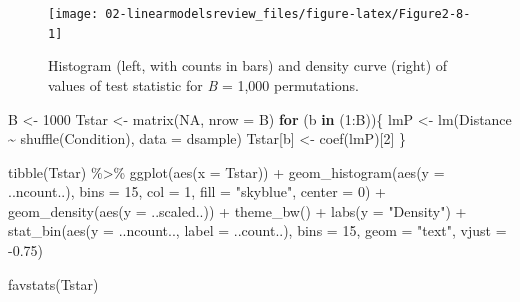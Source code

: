 \documentclass[
]{book}
\newenvironment{Shaded}{\begin{snugshade}}{\end{snugshade}}
\newcommand{\AttributeTok}[1]{\textcolor[rgb]{0.77,0.63,0.00}{#1}}
\newcommand{\ConstantTok}[1]{\textcolor[rgb]{0.00,0.00,0.00}{#1}}
\newcommand{\ControlFlowTok}[1]{\textcolor[rgb]{0.13,0.29,0.53}{\textbf{#1}}}
\newcommand{\DecValTok}[1]{\textcolor[rgb]{0.00,0.00,0.81}{#1}}
\newcommand{\FloatTok}[1]{\textcolor[rgb]{0.00,0.00,0.81}{#1}}
\newcommand{\FunctionTok}[1]{\textcolor[rgb]{0.00,0.00,0.00}{#1}}
\newcommand{\NormalTok}[1]{#1}
\newcommand{\OtherTok}[1]{\textcolor[rgb]{0.56,0.35,0.01}{#1}}
\newcommand{\SpecialCharTok}[1]{\textcolor[rgb]{0.00,0.00,0.00}{#1}}
\newcommand{\StringTok}[1]{\textcolor[rgb]{0.31,0.60,0.02}{#1}}
\begin{document}
\begin{figure}[ht!]

{\centering \texttt{[image: 02-linearmodelsreview\_files/figure-latex/Figure2-8-1]} 

}

\caption{Histogram (left, with counts in bars) and density curve (right) of values of test statistic for \emph{B} = 1,000 permutations.}\label{fig:Figure2-8}
\end{figure}

\begin{Shaded}
\begin{Highlighting}[]
\NormalTok{B }\OtherTok{\textless{}{-}} \DecValTok{1000}
\NormalTok{Tstar }\OtherTok{\textless{}{-}} \FunctionTok{matrix}\NormalTok{(}\ConstantTok{NA}\NormalTok{, }\AttributeTok{nrow =}\NormalTok{ B)}
\ControlFlowTok{for}\NormalTok{ (b }\ControlFlowTok{in}\NormalTok{ (}\DecValTok{1}\SpecialCharTok{:}\NormalTok{B))\{}
\NormalTok{  lmP }\OtherTok{\textless{}{-}} \FunctionTok{lm}\NormalTok{(Distance }\SpecialCharTok{\textasciitilde{}} \FunctionTok{shuffle}\NormalTok{(Condition), }\AttributeTok{data =}\NormalTok{ dsample)}
\NormalTok{  Tstar[b] }\OtherTok{\textless{}{-}} \FunctionTok{coef}\NormalTok{(lmP)[}\DecValTok{2}\NormalTok{]}
\NormalTok{\}}
\end{Highlighting}
\end{Shaded}

\newpage

\small

\begin{Shaded}
\begin{Highlighting}[]
\FunctionTok{tibble}\NormalTok{(Tstar) }\SpecialCharTok{\%\textgreater{}\%} \FunctionTok{ggplot}\NormalTok{(}\FunctionTok{aes}\NormalTok{(}\AttributeTok{x =}\NormalTok{ Tstar)) }\SpecialCharTok{+} 
  \FunctionTok{geom\_histogram}\NormalTok{(}\FunctionTok{aes}\NormalTok{(}\AttributeTok{y =}\NormalTok{ ..ncount..), }\AttributeTok{bins =} \DecValTok{15}\NormalTok{, }\AttributeTok{col =} \DecValTok{1}\NormalTok{, }\AttributeTok{fill =} \StringTok{"skyblue"}\NormalTok{, }\AttributeTok{center =} \DecValTok{0}\NormalTok{) }\SpecialCharTok{+} 
  \FunctionTok{geom\_density}\NormalTok{(}\FunctionTok{aes}\NormalTok{(}\AttributeTok{y =}\NormalTok{ ..scaled..)) }\SpecialCharTok{+}
  \FunctionTok{theme\_bw}\NormalTok{() }\SpecialCharTok{+}
  \FunctionTok{labs}\NormalTok{(}\AttributeTok{y =} \StringTok{"Density"}\NormalTok{) }\SpecialCharTok{+}
  \FunctionTok{stat\_bin}\NormalTok{(}\FunctionTok{aes}\NormalTok{(}\AttributeTok{y =}\NormalTok{ ..ncount.., }\AttributeTok{label =}\NormalTok{ ..count..), }\AttributeTok{bins =} \DecValTok{15}\NormalTok{, }\AttributeTok{geom =} \StringTok{"text"}\NormalTok{, }\AttributeTok{vjust =} \SpecialCharTok{{-}}\FloatTok{0.75}\NormalTok{)}

\FunctionTok{favstats}\NormalTok{(Tstar)}
\end{Highlighting}
\end{Shaded}
\end{document}
